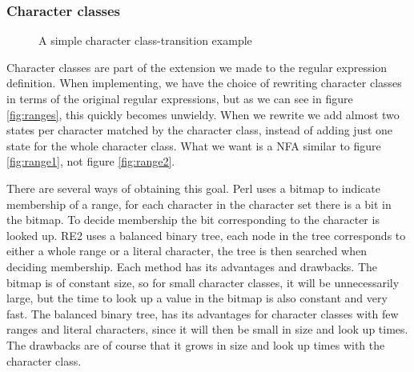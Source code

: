 \subsubsection{Character classes}
\label{sec:ranges_impl}

\begin{figure}
  \centering 
  \caption{A simple character class-transition example}
  \label{fig:ranges}
\end{figure}

Character classes are part of the extension we made to the regular
expression definition. When implementing, we have the choice of
rewriting character classes in terms of the original regular
expressions, but as we can see in figure \vref{fig:ranges}, this
quickly becomes unwieldy. When we rewrite we add almost two states per
character matched by the character class, instead of adding just one
state for the whole character class. What we want is a NFA similar to
figure \ref{fig:range1}, not figure \ref{fig:range2}.

There are several ways of obtaining this goal. Perl uses a bitmap to
indicate membership of a range, for each character in the character
set there is a bit in the bitmap. To decide membership the bit
corresponding to the character is looked up. RE2 uses a balanced
binary tree, each node in the tree corresponds to either a whole range
or a literal character, the tree is then searched when deciding
membership. Each method has its advantages and drawbacks. The bitmap
is of constant size, so for small character classes, it will be
unnecessarily large, but the time to look up a value in the bitmap is
also constant and very fast. The balanced binary tree, has its
advantages for character classes with few ranges and literal
characters, since it will then be small in size and look up times. The
drawbacks are of course that it grows in size and look up times with
the character class.

